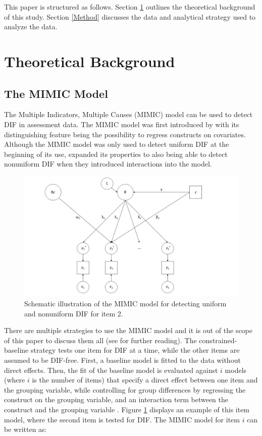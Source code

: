 \documentclass{article}
\begin{document}
This paper is structured as follows. Section \ref{Theory} outlines the theoretical background of this study. Section \ref{Method} discusses the data and analytical strategy used to analyze the data. 

\section{Theoretical Background} \label{Theory}

\subsection{The MIMIC Model} \label{sec:mimic}
The Multiple Indicators, Multiple Causes (MIMIC) model can be used to detect DIF in assessment data. The MIMIC model was first introduced by \citet{joreskog1975estimation} with its distinguishing feature being the possibility to regress constructs on covariates. Although the MIMIC model was only used to detect uniform DIF at the beginning of its use, \citet{woods2009illustration} expanded its properties to also being able to detect nonuniform DIF when they introduced interactions into the model.   

\begin{figure}[!ht]
    \centering
    \includegraphics[scale = 0.45]{MIMIC_model.jpg}
    \caption{Schematic illustration of the MIMIC model for detecting uniform and nonuniform DIF for item 2.}
    \label{fig:mimicmodel}
\end{figure}

There are multiple strategies to use the MIMIC model and it is out of the scope of this paper to discuss them all (see \citet{lee2018methodological} for further reading). The constrained-baseline strategy tests one item for DIF at a time, while the other items are assumed to be DIF-free. First, a baseline model is fitted to the data without direct effects. Then, the fit of the baseline model is evaluated against $i$ models (where $i$ is the number of items) that specify a direct effect between one item and the grouping variable, while controlling for group differences by regressing the construct on the grouping variable, and an interaction term between the construct and the grouping variable \citep{lee2018methodological}. Figure \ref{fig:mimicmodel} displays an example of this item model, where the second item is tested for DIF. The MIMIC model for item $i$ can be written as:
\end{document}

